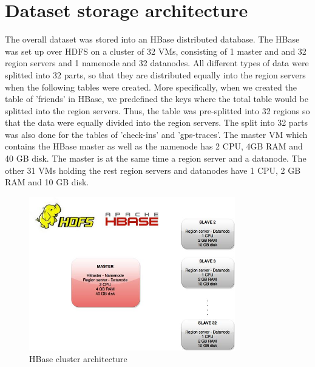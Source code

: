 \section{Dataset storage architecture}

The overall dataset was stored into an HBase distributed database. The HBase was set up over HDFS on a cluster of 32 VMs, consisting of 1 master and and 32 region servers 
and 1 namenode and 32 datanodes. All different types of data were splitted into 32 parts, so that they are distributed equally into the region servers when the 
following tables were created. More specifically, when we created the table of 'friends' in HBase, we predefined the keys where the total table would be splitted 
into the region servers. Thus, the table was pre-splitted into 32 regions so that the data were equally divided into the region servers. The split into 32 parts was 
also done for the tables of 'check-ins' and 'gps-traces'. The master VM which contains the HBase master as well as the namenode has 2 CPU, 4GB RAM and 40 GB disk. 
The master is at the same time a region server and a datanode. The other 31 VMs holding the rest region servers and datanodes have 1 CPU, 2 GB RAM and 10 GB disk. 

\begin{figure}[H]
  \centering
  \includegraphics[width=0.8\textwidth]{figures/hbase_cluster.jpg}
  \caption{HBase cluster architecture}
\end{figure}

